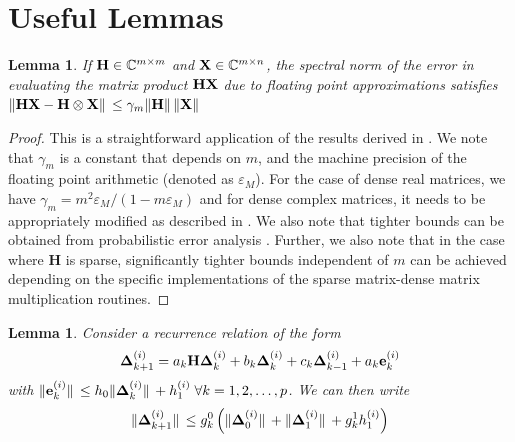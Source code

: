 \documentclass[preprint,3p,number,sort&compress]{elsarticle}
\newtheorem{lemma}[theorem]{Lemma}
\newcommand{\be}{\textbf{e}}
\newcommand{\bH}{\textbf{H}}
\newcommand{\bX}{\textbf{X}}
\newcommand{\bDelta}{\boldsymbol{\Delta}}
\DeclarePairedDelimiter\norm{\lVert}{\rVert\,}%
\begin{document}
\section{Useful Lemmas}
\begin{lemma}
 If $\normalfont\bH\in\mathbb{C}^{m\times m}$ and $\normalfont\bX\in\mathbb{C}^{m\times n}$, the spectral norm of the error in evaluating the matrix product $\normalfont\bH\bX$ due to floating point approximations satisfies $\normalfont\norm{\bH\bX-{\bH\otimes\bX}}\leq\gamma_m\norm{\bH}\norm{\bX}$\label{lem:FPErrorMatmul}
\end{lemma}
\begin{proof}
 This is a straightforward application of the results derived in \cite[section 3.5]{highamAccuracyStabilityNumerical2002}. We note that $\gamma_m$ is a constant that depends on $m$, and the machine precision of the floating point arithmetic (denoted as $\varepsilon_M$). For the case of dense real matrices, we have $\gamma_m=m^{2}\varepsilon_M/(1-m\varepsilon_M)$ and for dense complex matrices, it needs to be appropriately modified as described in \cite[section 3.6]{highamAccuracyStabilityNumerical2002}. We also note that tighter bounds can be obtained from probabilistic error analysis \cite{ipsenProbabilisticErrorAnalysis2020,highamSharperProbabilisticBackward2020}. Further, we also note that in the case where $\bH$ is sparse, significantly tighter bounds independent of $m$ can be achieved depending on the specific implementations of the sparse matrix-dense matrix multiplication routines. 
\end{proof}
\begin{lemma}
 Consider a recurrence relation of the form
\begin{align}
\normalfont\bDelta_{k+1}^{(i)}=a_k\bH\bDelta_{k}^{(i)}+b_k\bDelta_{k}^{(i)}+c_k\bDelta_{k-1}^{(i)}+a_k\be_k^{(i)}\label{eqn:errRecGen}
\end{align}
with $\normalfont\norm{\be_k^{(i)}}\leq h_0\norm{\bDelta_{k}^{(i)}}+h_1^{(i)}\;\forall k=1,2,\dots,p$. We can then write
  \begin{align}
  \norm{\bDelta_{k+1}^{(i)}}\leq g_k^0\left(\norm{\bDelta_0^{(i)}}+\norm{\bDelta_1^{(i)}}+g_k^1h_1^{(i)}\right)
 \end{align}\label{thm:errGen}
\end{lemma}
\end{document}
